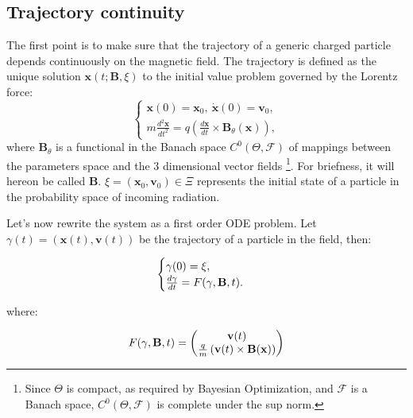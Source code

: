 \documentclass{article}
\begin{document}
	\subsection{Trajectory continuity}
	The first point is to make sure that the trajectory of a generic charged particle  depends continuously on the magnetic field. The trajectory is defined as the unique solution $\mathbf{x}(t; \mathbf{B}, \xi)$ to the initial value problem governed by the Lorentz force:
	\begin{equation}
		\begin{cases}
			\mathbf{x}(0) = \mathbf{x}_0, \ \dot{\mathbf{x}}(0) = \mathbf{v}_0, \\
			m \frac{d^2\mathbf{x}}{dt^2} = q \left( \frac{d\mathbf{x}}{dt} \times \mathbf{B}_\theta(\mathbf{x}) \right),
		\end{cases}
	\end{equation}
	where $\mathbf{B}_\theta$ is a functional in the Banach space $C^0(\Theta, \mathcal{F})$ of mappings between the parameters space and the 3 dimensional vector fields \footnote{Since $\Theta$ is compact, as required by Bayesian Optimization, and $\mathcal{F}$ is a Banach space, $C^0(\Theta, \mathcal{F})$ is complete under the sup norm.}. For briefness, it will hereon be called $\mathbf{B}$. $\xi = (\mathbf{x}_0, \mathbf{v}_0) \in \Xi$ represents the initial state of a particle in the probability space of incoming radiation.
	
	Let's now rewrite the system as a first order ODE problem. Let $\gamma(t) = (\mathbf{x}(t), \mathbf{v}(t))$ be the trajectory of a particle in the field, then:
	
	\begin{equation} \label{ode_first}
		\begin{cases}
			\gamma(0) = \xi, \\
			{d \gamma \over dt} = F(\gamma, \mathbf{B}, t).
		\end{cases}
	\end{equation}
	
	where:
	
	\begin{equation} \label{eq:ode_complete}
		F(\gamma, \mathbf{B}, t) =
		\begin{pmatrix}
			\mathbf{v}(t) \\
			{q \over m} \left( \mathbf{v}(t) \times \mathbf{B}(\mathbf{x}) \right)
		\end{pmatrix}
	\end{equation}
	
\end{document}
